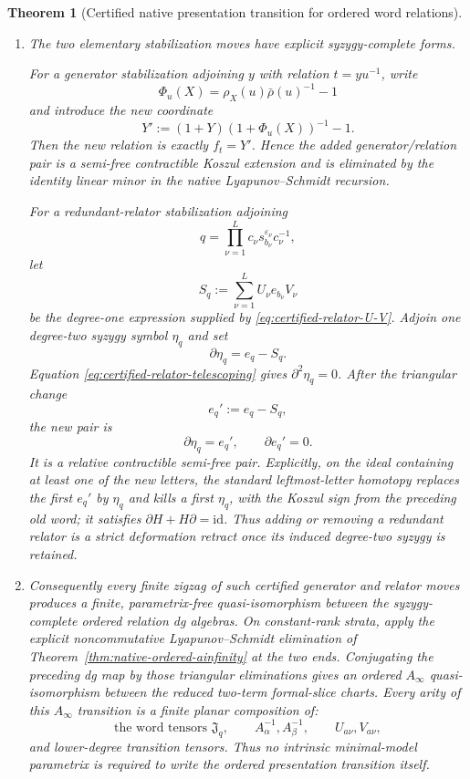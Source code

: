 \documentclass[11pt]{article}
\newtheorem{theorem}{Theorem}[section]
\theoremstyle{definition}
\begin{document}
\begin{theorem}[Certified native presentation transition for ordered word relations]
\begin{enumerate}[label=\textnormal{(\roman*)}]
\item The two elementary stabilization moves have explicit syzygy-complete
forms.

For a generator stabilization adjoining $y$ with relation
$t=yu^{-1}$, write
\[
 \Phi_u(X)=\rho_X(u)\bar\rho(u)^{-1}-1
\]
and introduce the new coordinate
\begin{equation}\label{eq:tietze-generator-contractible-coordinate}
 Y':=(1+Y)(1+\Phi_u(X))^{-1}-1.
\end{equation}
Then the new relation is exactly $f_t=Y'$.  Hence the added generator/relation
pair is a semi-free contractible Koszul extension and is eliminated by the
identity linear minor in the native Lyapunov--Schmidt recursion.

For a redundant-relator stabilization adjoining
\[
 q=\prod_{\nu=1}^{L}c_\nu s_{b_\nu}^{\varepsilon_\nu}c_\nu^{-1},
\]
let
\[
 S_q:=\sum_{\nu=1}^{L}U_\nu e_{b_\nu}V_\nu
\]
be the degree-one expression supplied by
\eqref{eq:certified-relator-U-V}.  Adjoin one degree-two syzygy symbol
$\eta_q$ and set
\begin{equation}\label{eq:tietze-redundant-relator-syzygy}
 \boxed{
 \partial\eta_q=e_q-S_q.
 }
\end{equation}
Equation \eqref{eq:certified-relator-telescoping} gives
$\partial^2\eta_q=0$.  After the triangular change
\[
 e_q':=e_q-S_q,
\]
the new pair is
\[
 \partial\eta_q=e_q',
 \qquad
 \partial e_q'=0.
\]
It is a relative contractible semi-free pair.  Explicitly, on the ideal
containing at least one of the new letters, the standard leftmost-letter
homotopy replaces the first $e_q'$ by $\eta_q$ and kills a first $\eta_q$,
with the Koszul sign from the preceding old word; it satisfies
$\partial H+H\partial=\mathrm{id}$.  Thus adding or removing a redundant
relator is a strict deformation retract once its induced degree-two syzygy is
retained.

\item Consequently every finite zigzag of such certified generator and
relator moves produces a finite, parametrix-free quasi-isomorphism between the
syzygy-complete ordered relation dg algebras.  On constant-rank strata, apply
the explicit noncommutative Lyapunov--Schmidt elimination of
Theorem~\ref{thm:native-ordered-ainfinity} at the two ends.  Conjugating the
preceding dg map by those triangular eliminations gives an ordered
$A_\infty$ quasi-isomorphism between the reduced two-term formal-slice charts.
Every arity of this $A_\infty$ transition is a finite planar composition of:
\[
 \text{the word tensors }\mathfrak J_q,
 \qquad
 A_\alpha^{-1},A_\beta^{-1},
 \qquad
 U_{a\nu},V_{a\nu},
\]
and lower-degree transition tensors.  Thus no intrinsic minimal-model
parametrix is required to write the ordered presentation transition itself.
\end{enumerate}
\end{theorem}
\end{document}
